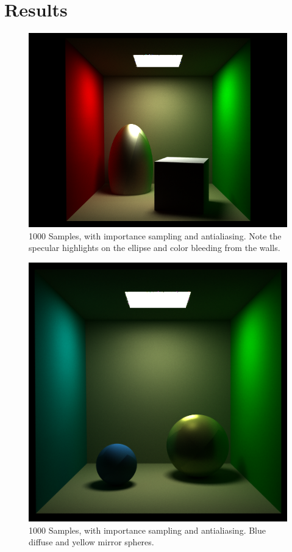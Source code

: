 \documentclass[11pt]{article}
\begin{document}
\section{Results}

\begin{figure}
	\begin{center}
		\includegraphics[width=.5\linewidth]{figs/specular_ellipse_1000samples}
		\caption{1000 Samples, with importance sampling and antialiasing. Note the specular highlights
		on the ellipse and color bleeding from the walls.}
	\end{center}
\end{figure}
\begin{figure}
	\begin{center}
		\includegraphics[width=.5\linewidth]{figs/2spheres_1000samples}
		\caption{1000 Samples, with importance sampling and antialiasing. Blue diffuse and yellow mirror spheres.}
	\end{center}
\end{figure}
\end{document}
